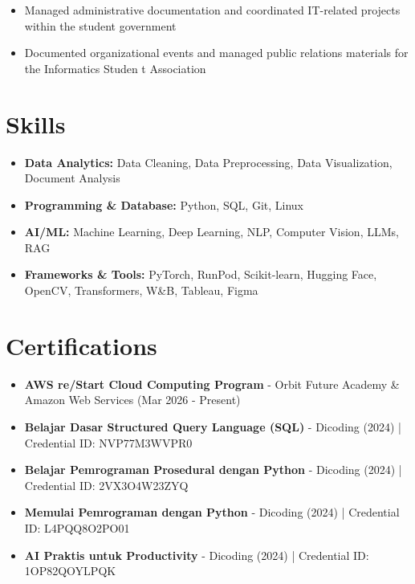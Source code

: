 \begin{itemize}
  \item Managed administrative documentation and coordinated IT-related projects within the student government
\end{itemize}

\begin{itemize}
  \item Documented organizational events and managed public relations materials for the Informatics Studen
  t Association
\end{itemize}

\section*{Skills}
\begin{itemize}
  \item \textbf{Data Analytics:} Data Cleaning, Data Preprocessing, Data Visualization, Document Analysis
  \item \textbf{Programming \& Database:} Python, SQL, Git, Linux
  \item \textbf{AI/ML:} Machine Learning, Deep Learning, NLP, Computer Vision, LLMs, RAG
  \item \textbf{Frameworks \& Tools:} PyTorch, RunPod, Scikit-learn, Hugging Face, OpenCV, Transformers, W\&B, Tableau, Figma
\end{itemize}

\section*{Certifications}
\begin{itemize}
  \item \textbf{AWS re/Start Cloud Computing Program} - Orbit Future Academy \& Amazon Web Services (Mar 2026 - Present)
  \item \textbf{Belajar Dasar Structured Query Language (SQL)} - Dicoding (2024) | Credential ID: NVP77M3WVPR0
  \item \textbf{Belajar Pemrograman Prosedural dengan Python} - Dicoding (2024) | Credential ID: 2VX3O4W23ZYQ
  \item \textbf{Memulai Pemrograman dengan Python} - Dicoding (2024) | Credential ID: L4PQQ8O2PO01
  \item \textbf{AI Praktis untuk Productivity} - Dicoding (2024) | Credential ID: 1OP82QOYLPQK
\end{itemize}

